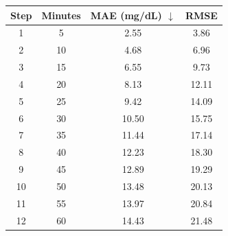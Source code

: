 \begin{tabular}{cccc}
\toprule
Step & Minutes & MAE (mg/dL) $\downarrow$ & RMSE \\
\midrule
1 & 5 & 2.55 & 3.86 \\
2 & 10 & 4.68 & 6.96 \\
3 & 15 & 6.55 & 9.73 \\
4 & 20 & 8.13 & 12.11 \\
5 & 25 & 9.42 & 14.09 \\
6 & 30 & 10.50 & 15.75 \\
7 & 35 & 11.44 & 17.14 \\
8 & 40 & 12.23 & 18.30 \\
9 & 45 & 12.89 & 19.29 \\
10 & 50 & 13.48 & 20.13 \\
11 & 55 & 13.97 & 20.84 \\
12 & 60 & 14.43 & 21.48 \\
\bottomrule
\end{tabular}
